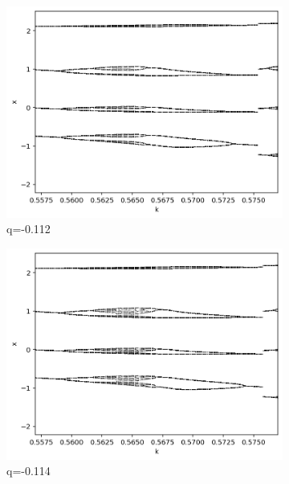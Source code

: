 \begin{figure}[h!]
	\centering

	\begin{subfigure}[b]{0.4\textwidth}
		\centering
		\includegraphics[width=\textwidth]{LateX images/graphs/g2}
		\caption{q=-0.112}
		\label{f:g3}
	\end{subfigure}
	\hfill
	\begin{subfigure}[b]{0.4\textwidth}
		\centering
		\includegraphics[width=\textwidth]{LateX images/graphs/g3}
		\caption{q=-0.114}
		\label{f:g4}
	\end{subfigure}
	\hfill
	\begin{subfigure}[b]{0.4\textwidth}
		\centering

\end{subfigure}
\end{figure}
